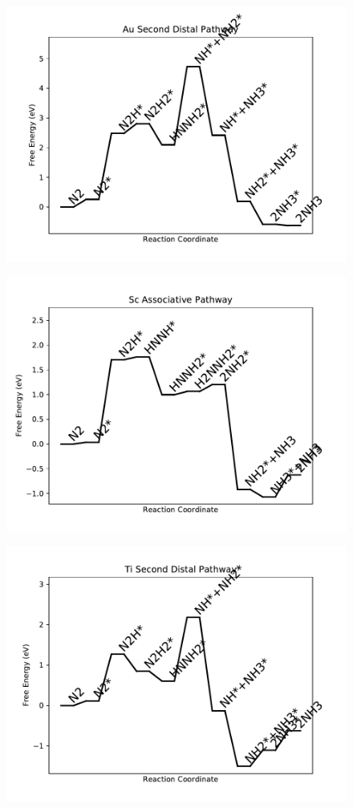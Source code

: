\begin{figure}
\includegraphics[width=0.8\linewidth]{data/plots/Au_distal_2.pdf}
\end{figure}

\begin{figure}
\includegraphics[width=0.8\linewidth]{data/plots/Sc_associative.pdf}
\end{figure}

\begin{figure}
\includegraphics[width=0.8\linewidth]{data/plots/Ti_distal_2.pdf}
\end{figure}

